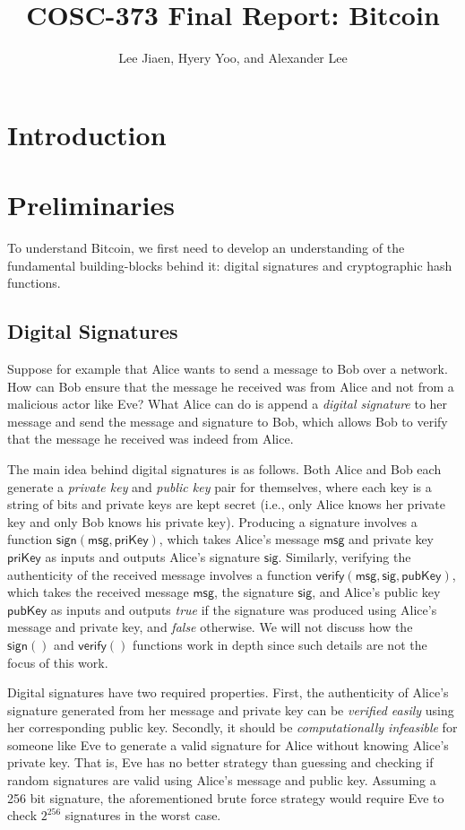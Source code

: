 \documentclass{article}
\title{COSC-373 Final Report: Bitcoin}
\author{Lee Jiaen, Hyery Yoo, and Alexander Lee}
\begin{document}
\maketitle

\section{Introduction}

\section{Preliminaries}

To understand Bitcoin, we first need to develop an understanding of the
fundamental building-blocks behind it: digital signatures and cryptographic hash
functions.

\subsection{Digital Signatures}

Suppose for example that Alice wants to send a message to Bob over a network.
How can Bob ensure that the message he received was from Alice and not from a
malicious actor like Eve? What Alice can do is append a \emph{digital signature}
to her message and send the message and signature to Bob, which allows Bob to
verify that the message he received was indeed from Alice.

The main idea behind digital signatures is as follows. Both Alice and Bob each
generate a \emph{private key} and \emph{public key} pair for themselves, where
each key is a string of bits and private keys are kept secret (i.e., only Alice
knows her private key and only Bob knows his private key). Producing a signature
involves a function $\mathsf{sign(msg, priKey)}$, which takes Alice's message
$\mathsf{msg}$ and private key $\mathsf{priKey}$ as inputs and outputs Alice's
signature $\mathsf{sig}$. Similarly, verifying the authenticity of the received
message involves a function $\mathsf{verify(msg, sig, pubKey)}$, which takes the
received message $\mathsf{msg}$, the signature $\mathsf{sig}$, and Alice's
public key $\mathsf{pubKey}$ as inputs and outputs \emph{true} if the signature
was produced using Alice's message and private key, and \emph{false} otherwise.
We will not discuss how the $\mathsf{sign()}$ and $\mathsf{verify()}$ functions
work in depth since such details are not the focus of this work.

Digital signatures have two required properties. First, the authenticity of
Alice's signature generated from her message and private key can be
\emph{verified easily} using her corresponding public key. Secondly, it should
be \emph{computationally infeasible} for someone like Eve to generate a valid
signature for Alice without knowing Alice's private key. That is, Eve has no
better strategy than guessing and checking if random signatures are valid using
Alice's message and public key. Assuming a 256 bit signature, the aforementioned
brute force strategy would require Eve to check $2^{256}$ signatures in the
worst case.
\end{document}

